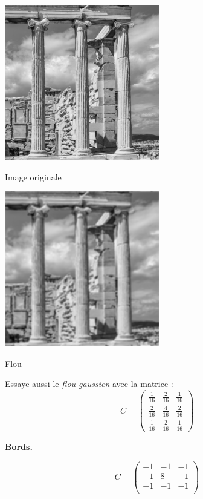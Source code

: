 \documentclass[11pt,class=report,crop=false]{standalone}
\begin{document}
\begin{activite}
\begin{center}
	\begin{minipage}{0.45\textwidth}\center
	\includegraphics[scale=\myscale,scale=0.5]{png/colonnes}
	
	Image originale
	\end{minipage}
	\begin{minipage}{0.45\textwidth}\center
	\includegraphics[scale=\myscale,scale=0.5]{png/colonnes_conv_flou}
	
	Flou
    \end{minipage}	
\end{center}


Essaye aussi le \emph{flou gaussien} avec la matrice : 
$$C = 
\begin{pmatrix}
\frac1{16}&\frac2{16}&\frac1{16}\\
\frac2{16}&\frac4{16}&\frac2{16}\\
\frac1{16}&\frac2{16}&\frac1{16}
\end{pmatrix}$$


\bigskip

\textbf{Bords.}

$$C = 
\begin{pmatrix}
-1&-1&-1\\
-1&8&-1\\
-1&-1&-1\\
\end{pmatrix}$$



\end{activite}
\end{document}

